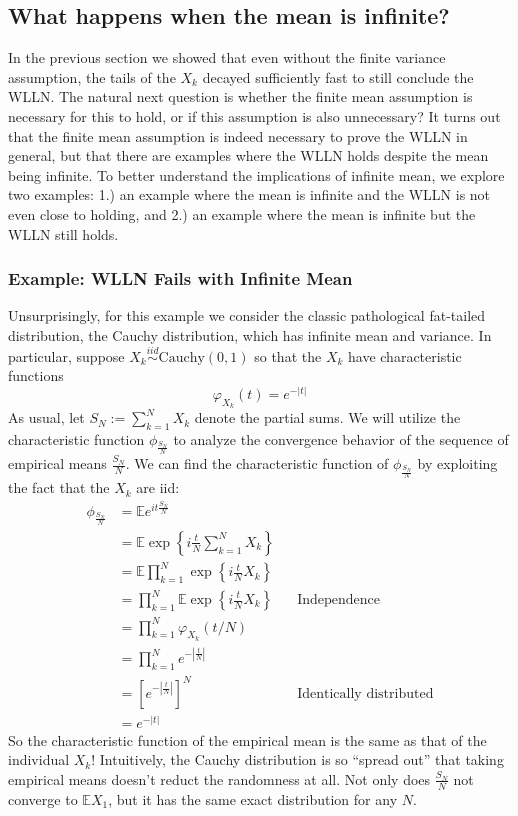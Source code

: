 \documentclass[12pt]{article}
\newcommand*{\abs}[1]{\left\lvert#1\right\rvert}
\newcommand{\E}{\mathbb{E}}
\begin{document}
\subsection{What happens when the mean is infinite?}
In the previous section we showed that even without the finite variance assumption, the tails of the $X_k$ decayed sufficiently fast to still conclude the WLLN. The natural next question is whether the finite mean assumption 
is necessary for this to hold, or if this assumption is also unnecessary? It turns out that the finite mean assumption is indeed necessary to prove the WLLN in general, but that there are examples where the WLLN holds despite 
the mean being infinite. To better understand the implications of infinite mean, we explore two examples: 1.) an example where the mean is infinite and the WLLN is not even close to holding, and 2.) an example where the mean is 
infinite but the WLLN still holds. 

\subsubsection{Example: WLLN Fails with Infinite Mean}
Unsurprisingly, for this example we consider the classic pathological fat-tailed distribution, the Cauchy distribution, which has infinite mean and variance.
 In particular, suppose $X_k \overset{iid}{\sim} \text{Cauchy}(0, 1)$ so that the $X_k$ have characteristic functions
\[\varphi_{X_k}(t) = e^{-\abs{t}}\]
As usual, let $S_N := \sum_{k = 1}^{N} X_k$ denote the partial sums. We will utilize the characteristic function $\phi_{\frac{S_N}{N}}$ to analyze the convergence behavior of the sequence of empirical means $\frac{S_N}{N}$. We can 
find the characteristic function of $\phi_{\frac{S_N}{N}}$ by exploiting the fact that the $X_k$ are iid: 
\begin{align*}
\phi_{\frac{S_N}{N}} &= \E e^{it \frac{S_N}{N}} \\
			       &= \E \exp\left\{i\frac{t}{N} \sum_{k = 1}^{N} X_k \right\} \\
			       &= \E \prod_{k = 1}^{N} \exp\left\{i \frac{t}{N} X_k \right\} \\
			       &= \prod_{k = 1}^{N} \E \exp\left\{i \frac{t}{N} X_k \right\} && \text{Independence} \\
			       &=  \prod_{k = 1}^{N} \varphi_{X_k}(t/N) \\
			       &= \prod_{k = 1}^{N} e^{-\abs{\frac{t}{N}}} \\
			       &= \left[ e^{-\abs{\frac{t}{N}}} \right]^N && \text{Identically distributed} \\
			       &= e^{-\abs{t}}
\end{align*} 
So the characteristic function of the empirical mean is the same as that of the individual $X_k$! Intuitively, the Cauchy distribution is so ``spread out'' that taking empirical means doesn't reduct the randomness at all. Not only does 
$\frac{S_N}{N}$ not converge to $\E X_1$, but it has the same exact distribution for any $N$.  
\end{document}
